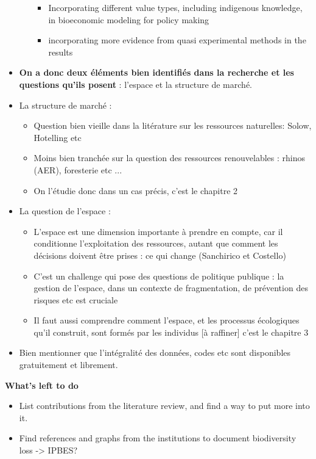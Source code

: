 \begin{itemize}
\begin{itemize}
\begin{itemize}
\item Incorporating different value types, including indigenous knowledge, in bioeconomic modeling for policy making

\item incorporating more evidence from quasi experimental methods in the results
\end{itemize}
\end{itemize}

\item \textbf{ On a donc deux éléments bien identifiés dans la recherche et les questions qu'ils posent }: l'espace et la structure de marché. 
\item La structure de marché : 
\begin{itemize}
\item Question bien vieille dans la litérature sur les ressources naturelles: Solow, Hotelling etc
\item Moins bien tranchée sur la question des ressources renouvelables : rhinos (AER), foresterie etc ... 
\item On l'étudie donc dans un cas précis, c'est le chapitre 2
\end{itemize}
\item La question de l'espace : 
\begin{itemize}
\item L'espace est une dimension importante à prendre en compte, car il conditionne l'exploitation des ressources, autant que comment les décisions doivent être prises : ce qui change (Sanchirico et Costello)
\item C'est un challenge qui pose des questions de politique publique : la gestion de l'espace, dans un contexte de fragmentation, de prévention des risques etc est cruciale 
\item Il faut aussi comprendre comment l'espace, et les processus écologiques qu'il construit, sont formés par les individus [à raffiner] c'est le chapitre 3
\end{itemize}
\item Bien mentionner que l'intégralité des données, codes etc sont disponibles gratuitement et librement. 
\end{itemize}

\textbf{What's left to do}
\begin{itemize}
\item List contributions from the literature review, and find a way to put more into it. 
\item Find references and graphs from the institutions to document biodiversity loss
-> IPBES?
\end{itemize}
\clearpage

